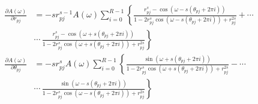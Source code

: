 \documentclass[a4paper,twoside,10pt,english]{report}
\begin{document}
\begin{raggedbottom}
\begin{align*}
\frac{\partial A\left(\omega\right)}{\partial r_{pj}} &= -sr_{pj}^{s-1}A\left(\omega\right)\sum_{i=0}^{R-1}\left\{ \frac{r_{pj}^{s}-\cos\left(\omega-s\left(\theta_{pj}+2\pi i\right)\right)}{1-2r_{pj}^{s}\cos\left(\omega-s\left(\theta_{pj}+2\pi i\right)\right)+r_{pj}^{2s}}+\cdots\right.\\
 & \left.\cdots\,\frac{r_{pj}^{s}-\cos\left(\omega+s\left(\theta_{pj}+2\pi i\right)\right)}{1-2r_{pj}^{s}\cos\left(\omega+s\left(\theta_{pj}+2\pi i\right)\right)+r_{pj}^{2s}}\right\} \\
\frac{\partial A\left(\omega\right)}{\partial\theta_{pj}} &= -sr_{pj}^{s}A\left(\omega\right)\sum_{i=0}^{R-1}\left\{ \frac{\sin\left(\omega+s\left(\theta_{pj}+2\pi i\right)\right)}{1-2r_{pj}^{s}\cos\left(\omega+s\left(\theta_{pj}+2\pi i\right)\right)+r_{pj}^{2s}}-\cdots\right.\\
 & \left.\cdots\,\frac{\sin\left(\omega-s\left(\theta_{pj}+2\pi i\right)\right)}{1-2r_{pj}^{s}\cos\left(\omega-s\left(\theta_{pj}+2\pi i\right)\right)+r_{pj}^{2s}}\right\} 
\end{align*}


\end{raggedbottom}
\end{document}
